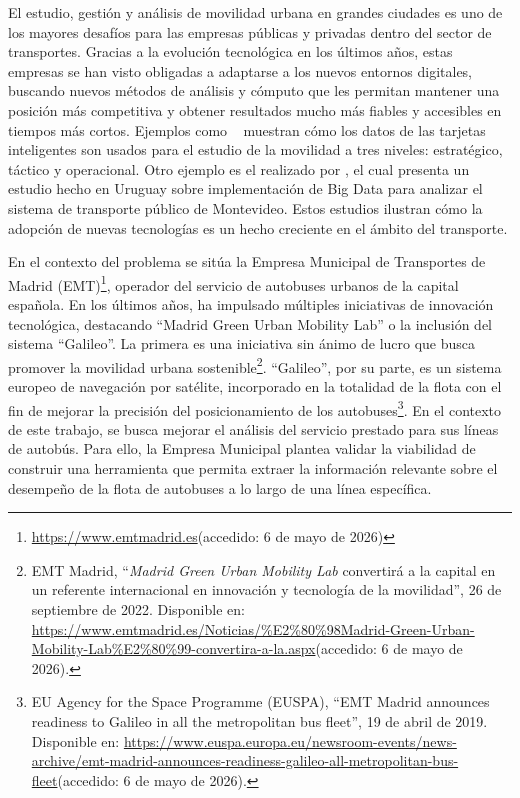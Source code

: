 El estudio, gestión y análisis de movilidad urbana en grandes ciudades es uno de los mayores desafíos para las empresas
públicas y privadas dentro del sector de transportes. Gracias a la evolución tecnológica en los últimos años, estas empresas
se han visto obligadas a adaptarse a los nuevos entornos digitales, buscando nuevos métodos de análisis y cómputo que les permitan
mantener una posición  más competitiva y obtener resultados mucho más fiables y accesibles en tiempos más cortos. Ejemplos como
~\textcite{pelletier2011smart} muestran cómo los datos de las tarjetas inteligentes son usados para el estudio de la movilidad a tres
niveles: estratégico, táctico y operacional. Otro ejemplo es el realizado por \textcite{nesmachnow2023bigdata}, el cual presenta un
estudio hecho en Uruguay sobre implementación de Big Data para analizar el sistema de transporte público de Montevideo. Estos estudios
ilustran cómo la adopción de nuevas tecnologías es un hecho creciente en el ámbito del transporte.

En el contexto del problema se sitúa la Empresa Municipal de Transportes de Madrid 
(EMT)\footnote{\url{https://www.emtmadrid.es}(accedido: 6 de mayo de 2026)}, operador del servicio de 
autobuses urbanos de la capital española. En los últimos años, ha impulsado múltiples iniciativas de 
innovación tecnológica, destacando \enquote{Madrid Green Urban Mobility Lab} o la inclusión del sistema
 \enquote{Galileo}. La primera es una iniciativa sin ánimo de lucro que busca promover la movilidad 
 urbana sostenible\footnote{EMT Madrid, \enquote{\textit{Madrid Green Urban Mobility Lab} convertirá a 
 la capital en un referente internacional en innovación y tecnología de la movilidad}, 26 de septiembre 
 de 2022. Disponible en: \url{https://www.emtmadrid.es/Noticias/\%E2\%80\%98Madrid-Green-Urban-Mobility-Lab\%E2\%80\%99-convertira-a-la.aspx}(accedido: 6 de mayo de 2026).}. \enquote{Galileo}, 
 por su parte, es un sistema europeo de navegación por satélite, incorporado en la totalidad de la 
 flota con el fin de mejorar la precisión del posicionamiento de los autobuses\footnote{EU Agency for the 
 Space Programme (EUSPA), \enquote{EMT Madrid announces readiness to Galileo in all the metropolitan 
 bus fleet}, 19 de abril de 2019. 
 Disponible en: \url{https://www.euspa.europa.eu/newsroom-events/news-archive/emt-madrid-announces-readiness-galileo-all-metropolitan-bus-fleet}(accedido: 6 de mayo de 2026).}. 
 En el contexto de este trabajo, se busca mejorar el análisis del servicio prestado 
 para sus líneas de autobús. Para ello, la Empresa Municipal plantea validar la viabilidad 
 de construir una herramienta que permita extraer la información relevante sobre el desempeño 
 de la flota de autobuses a lo largo de una línea específica.

